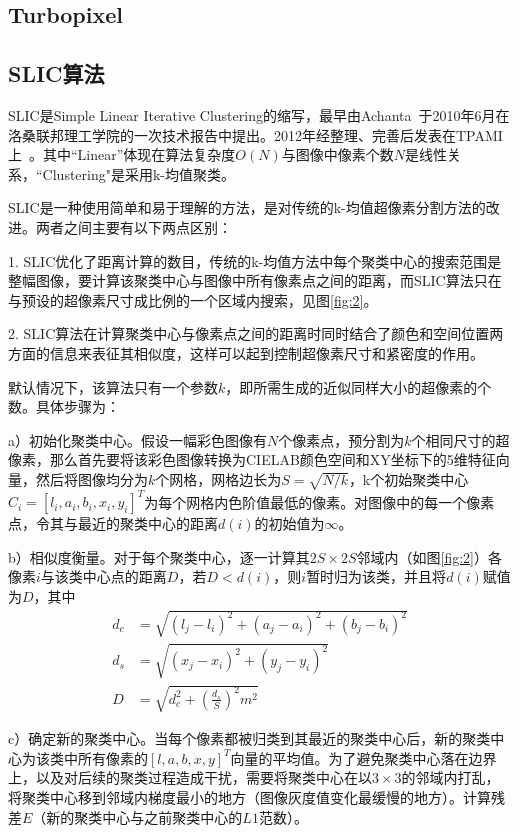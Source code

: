 \documentclass[12pt]{article}
\begin{document}
\subsection{Turbopixel}

\subsection{SLIC算法}

SLIC是Simple Linear Iterative Clustering的缩写，最早由Achanta~\cite{2}于2010年6月在洛桑联邦理工学院的一次技术报告中提出。2012年经整理、完善后发表在TPAMI上~\cite{3}。其中“Linear”体现在算法复杂度$O(N)$与图像中像素个数$N$是线性关系，“Clustering"是采用k-均值聚类。

SLIC是一种使用简单和易于理解的方法，是对传统的k-均值超像素分割方法的改进。两者之间主要有以下两点区别：

1. SLIC优化了距离计算的数目，传统的k-均值方法中每个聚类中心的搜索范围是整幅图像，要计算该聚类中心与图像中所有像素点之间的距离，而SLIC算法只在与预设的超像素尺寸成比例的一个区域内搜索，见图\ref{fig:2}。

2. SLIC算法在计算聚类中心与像素点之间的距离时同时结合了颜色和空间位置两方面的信息来表征其相似度，这样可以起到控制超像素尺寸和紧密度的作用。

默认情况下，该算法只有一个参数$k$，即所需生成的近似同样大小的超像素的个数。具体步骤为：

a）初始化聚类中心。假设一幅彩色图像有$N$个像素点，预分割为$k$个相同尺寸的超像素，那么首先要将该彩色图像转换为CIELAB颜色空间和XY坐标下的5维特征向量，然后将图像均分为$k$个网格，网格边长为$S=\sqrt{N/k}$，k个初始聚类中心$C_i=[l_i, a_i, b_i, x_i, y_i]^T$为每个网格内色阶值最低的像素。对图像中的每一个像素点，令其与最近的聚类中心的距离$d(i)$的初始值为$\infty$。

b）相似度衡量。对于每个聚类中心，逐一计算其$2S \times 2S$邻域内（如图\ref{fig:2}）各像素$i$与该类中心点的距离$D$，若$D<d(i)$，则$i$暂时归为该类，并且将$d(i)$赋值为$D$，其中
\begin{align}
d_c & =  \sqrt{(l_j-l_i)^2+(a_j-a_i)^2+(b_j-b_i)^2}\\
d_s & =  \sqrt{(x_j-x_i)^2+(y_j-y_i)^2}\\
D & =  \sqrt{d_c^2+\left(\frac{d_s}{S}\right)^2m^2}
\end{align}

c）确定新的聚类中心。当每个像素都被归类到其最近的聚类中心后，新的聚类中心为该类中所有像素的$[l, a, b, x, y]^T$向量的平均值。为了避免聚类中心落在边界上，以及对后续的聚类过程造成干扰，需要将聚类中心在以$3\times3$的邻域内打乱，将聚类中心移到邻域内梯度最小的地方（图像灰度值变化最缓慢的地方）。计算残差$E$（新的聚类中心与之前聚类中心的$L1$范数）。
\end{document}
